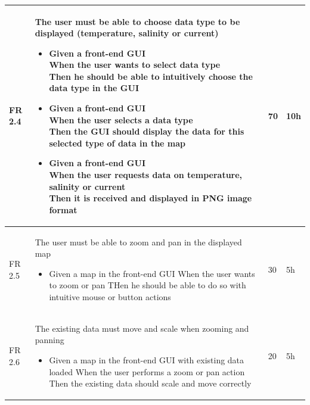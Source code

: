 \documentclass[11pt,a4paper,titlepage,oneside]{report}
\begin{document}
\begin{longtable}{p{1.4cm} p{7.8cm} p{1cm} p{1cm} }
  FR 2.4 & The user must be able to choose data type to be displayed (temperature, salinity or current)
  \begin{itemize}
  \item \parbox[t]{6.8cm}{
        Given a front-end GUI \\
        When the user wants to select data type \\
        Then he should be able to intuitively choose the data type in the GUI}
  \item \parbox[t]{6.8cm}{
        Given a front-end GUI \\
        When the user selects a data type \\
        Then the GUI should display the data for this selected type of data in the map}
  \item \parbox[t]{6.8cm}{
        Given a front-end GUI \\
        When the user requests data on temperature, salinity or current \\
        Then it is received and displayed in \gls{PNG} image format}
  \end{itemize}
  & 70 & 10h \\ \hline

  FR 2.5 & The user must be able to zoom and pan in the displayed map
  \begin{itemize}
  \item \parbox[t]{6.8cm}{
        Given a map in the front-end GUI
        When the user wants to zoom or pan
        THen he should be able to do so with intuitive mouse or button actions}
  \end{itemize}
  & 30 & 5h \\ \hline

  FR 2.6 & The existing data must move and scale when zooming and panning
  \begin{itemize}
  \item \parbox[t]{6.8cm}{
        Given a map in the front-end GUI with existing data loaded
        When the user performs a zoom or pan action
        Then the existing data should scale and move correctly}
  \end{itemize}
  & 20 & 5h \\ \hline


\end{longtable}
\end{document}
